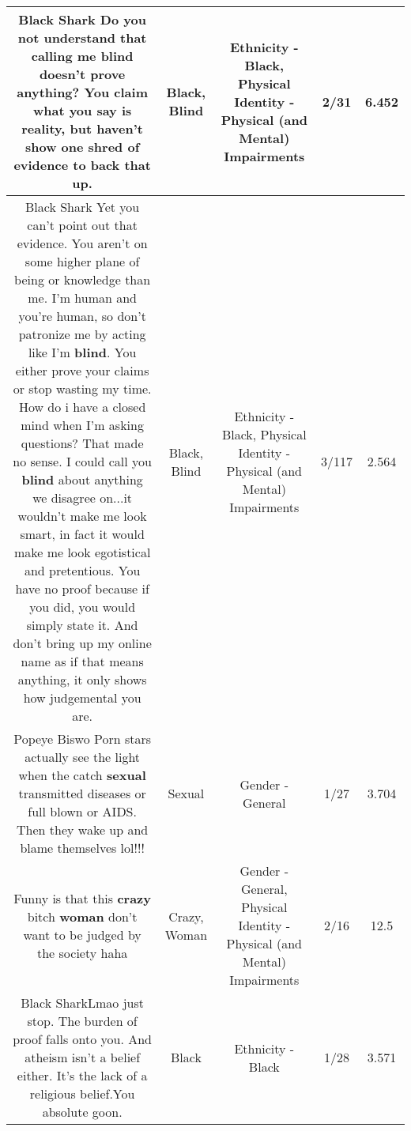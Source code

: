 \documentclass[11pt]{article}
\newlength\mylength
\begin{document}
\begin{center}
\begin{longtable}{|C{.65\mylength}|C{.30\mylength}|C{.12\mylength}|C{.12\mylength}|C{.12\mylength}|}
  \small Black Shark Do you not understand that calling me \textbf{blind} doesn't prove anything? You claim what you say is reality, but haven't show one shred of evidence to back that up.\normalsize   & Black, Blind & Ethnicity - Black, Physical Identity - Physical (and Mental) Impairments & 2/31 & 6.452 \\  \hline
  \small Black Shark Yet you can't point out that evidence. You aren't on some higher plane of being or knowledge than me. I'm human and you're human, so don't patronize me by acting like I'm \textbf{blind}. You either prove your claims or stop wasting my time. How do i have a closed mind when I'm asking questions? That made no sense. I could call you \textbf{blind} about anything we disagree on...it wouldn't make me look smart, in fact it would make me look egotistical and pretentious. You have no proof because if you did, you would simply state it. And don't bring up my online name as if that means anything, it only shows how judgemental you are.\normalsize   & Black, Blind & Ethnicity - Black, Physical Identity - Physical (and Mental) Impairments & 3/117 & 2.564 \\  \hline
  \small Popeye Biswo Porn stars actually see the light when the catch \textbf{sexual} transmitted diseases or full blown or AIDS.  Then they wake up and blame themselves lol!!!\normalsize   & Sexual & Gender - General & 1/27 & 3.704 \\  \hline
  \small Funny is that this \textbf{crazy} bitch \textbf{woman} don't want to be judged by the society haha\normalsize   & Crazy, Woman & Gender - General, Physical Identity - Physical (and Mental) Impairments & 2/16 & 12.5 \\  \hline
  \small Black SharkLmao just stop.  The burden of proof falls onto you.  And atheism isn't a belief either. It's the lack of a religious belief.You absolute goon.\normalsize   & Black & Ethnicity - Black & 1/28 & 3.571 \\  \hline

\end{longtable}
\end{center}
\end{document}
